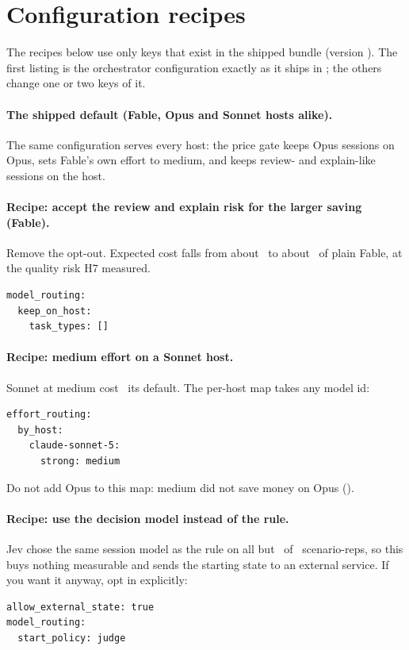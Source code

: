 \section{Configuration recipes}\label{sec:recipes}

The recipes below use only keys that exist in the shipped bundle (version \BundleVersion). The first listing is the
orchestrator configuration exactly as it ships in ; the others change one or two
keys of it.

\paragraph{The shipped default (Fable, Opus and Sonnet hosts alike).} The same configuration serves every host: the
price gate keeps Opus sessions on Opus,  sets Fable's own effort to medium, and 
keeps review- and explain-like sessions on the host.\par
{\small
}

\paragraph{Recipe: accept the review and explain risk for the larger saving (Fable).} Remove the opt-out. Expected
cost falls from about \KpProxyTwo\X\ to about \KpRstarTwo\X\ of plain Fable, at the quality risk H7 measured.
\begin{lstlisting}[basicstyle=\ttfamily\footnotesize, frame=single, rulecolor=\color{okgray}]
model_routing:
  keep_on_host:
    task_types: []
\end{lstlisting}

\paragraph{Recipe: medium effort on a Sonnet host.} Sonnet at medium cost \EcRatio\X\ its default. The per-host map
takes any model id:
\begin{lstlisting}[basicstyle=\ttfamily\footnotesize, frame=single, rulecolor=\color{okgray}]
effort_routing:
  by_host:
    claude-sonnet-5:
      strong: medium
\end{lstlisting}
Do not add Opus to this map: medium did not save money on Opus (\SHFourRatio\X).

\paragraph{Recipe: use the decision model instead of the rule.} Jev chose the same session model as the rule on all
but \SHTwoDisc\ of \SHTwoReps\ scenario-reps, so this buys nothing measurable and sends the starting state to an
external service. If you want it anyway, opt in explicitly:
\begin{lstlisting}[basicstyle=\ttfamily\footnotesize, frame=single, rulecolor=\color{okgray}]
allow_external_state: true
model_routing:
  start_policy: judge
\end{lstlisting}

